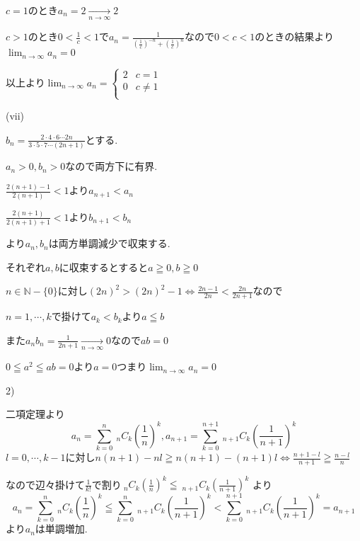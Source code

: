 \documentclass{jsarticle}
\begin{document}
       $c=1$のとき$a_n=2\xrightarrow[n\to\infty]{}2$
       
       $c>1$のとき$0<\frac{1}{c}<1$で$a_n=\frac{1}{(\frac{1}{c})^{-n}+(\frac{1}{c})^{n}}$なので$0<c<1$のときの結果より$\displaystyle \lim_{n\to \infty}a_n=0$
       
       以上より$\displaystyle \lim_{n\to \infty}a_n=\begin{cases}
       2 & c=1\\
       0 & c\neq 1\\
       \end{cases}$
       
       (vii)
       
       $b_n=\frac{2\cdot4\cdot 6\cdots 2n}{3\cdot5\cdot 7\cdots (2n+1)}$とする.
       
       $a_n>0,b_n>0$なので両方下に有界.
       
       $\frac{2(n+1)-1}{2(n+1)}<1$より$a_{n+1}<a_n$
       
              $\frac{2(n+1)}{2(n+1)+1}<1$より$b_{n+1}<b_n$
              
              より$a_n,b_n$は両方単調減少で収束する.
              
              それぞれ$a,b$に収束するとすると$a\geqq0,b\geqq 0$
              
             $n\in\mathbb{N}-\{0\}$に対し$(2n)^2>(2n)^2-1\Leftrightarrow \frac{2n-1}{2n}<\frac{2n}{2n+1}$なので
             
             $n=1,\cdots ,k$で掛けて$a_k<b_k$より$a\leqq b$
             
             また$a_nb_n = \frac{1}{2n+1}\xrightarrow[n\to\infty]{}0$なので$ab=0$
             
             $0\leqq a^2\leqq ab = 0$より$a=0$つまり$\displaystyle \lim_{n\to\infty}a_n=0$
       
       2)
       
       二項定理より
       \[a_n=\sum_{k=0}^n \ _nC_k (\frac{1}{n})^k,a_{n+1}=\sum_{k=0}^{n+1} \ _{n+1}C_k (\frac{1}{n+1})^k\]
      $l=0,\cdots ,k-1$に対し$n(n+1)-nl\geqq n(n+1)-(n+1)l\Leftrightarrow \frac{n+1-l}{n+1}\geqq \frac{n-l}{n}$
      
      なので辺々掛けて$\frac{1}{k!}$で割り$ \ _nC_k (\frac{1}{n})^k \leqq \ _{n+1}C_k (\frac{1}{n+1})^k$
      より
              \[a_n=\sum_{k=0}^n \ _nC_k (\frac{1}{n})^k\leqq \sum_{k=0}^{n} \ _{n+1}C_k (\frac{1}{n+1})^k < \sum_{k=0}^{n+1} \ _{n+1}C_k (\frac{1}{n+1})^k=a_{n+1}\]
              より$a_n$は単調増加.
              
\end{document}
